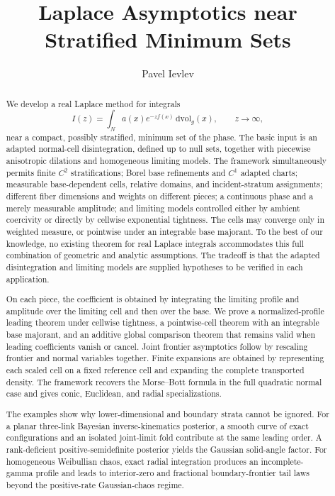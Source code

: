 \documentclass[11pt]{amsart}
\title[Laplace Asymptotics near Stratified Minimum Sets]{Laplace Asymptotics near Stratified Minimum Sets}
\author{Pavel Ievlev}
\date{}
\numberwithin{equation}{section}
\theoremstyle{definition}
\theoremstyle{remark}
\newcommand{\dvol}{\,\mathrm{dvol}}
\begin{document}
\begin{abstract}
We develop a real Laplace method for integrals
\begin{equation*}
  I(z)=\int_N a(x)e^{-z f(x)}\dvol_g(x),\qquad z\to\infty,
\end{equation*}
near a compact, possibly stratified, minimum set of the phase.  The basic input
is an adapted normal-cell disintegration, defined up to null sets, together with
piecewise anisotropic dilations and homogeneous limiting models.  The framework
simultaneously permits finite $C^2$ stratifications; Borel base refinements and
$C^1$ adapted charts; measurable base-dependent cells, relative domains, and
incident-stratum assignments; different fiber dimensions and weights on
different pieces; a continuous phase and a merely measurable amplitude; and
limiting models controlled either by ambient coercivity or directly by
cellwise exponential tightness.  The cells may converge only in weighted
measure, or pointwise under an integrable base majorant.  To the best of our
knowledge, no existing theorem for real Laplace integrals accommodates this
full combination of geometric and analytic assumptions.  The tradeoff is that
the adapted disintegration and limiting models are supplied hypotheses to be
verified in each application.

On each piece, the coefficient is obtained by integrating the limiting profile
and amplitude over the limiting cell and then over the base.  We prove a
normalized-profile leading theorem under cellwise tightness, a pointwise-cell
theorem with an integrable base majorant, and an additive global comparison
theorem that remains valid when leading coefficients vanish or cancel.  Joint
frontier asymptotics follow by rescaling frontier and normal variables together.
Finite expansions are obtained by representing each scaled cell on a fixed
reference cell and expanding the complete transported density.  The framework
recovers the Morse--Bott formula in the full quadratic normal case and gives
conic, Euclidean, and radial specializations.

The examples show why lower-dimensional and boundary strata cannot be ignored.
For a planar three-link Bayesian inverse-kinematics posterior, a smooth curve of
exact configurations and an isolated joint-limit fold contribute at the same
leading order.  A rank-deficient positive-semidefinite posterior yields the
Gaussian solid-angle factor.  For homogeneous Weibullian chaos, exact radial
integration produces an incomplete-gamma profile and leads to interior-zero and
fractional boundary-frontier tail laws beyond the positive-rate Gaussian-chaos
regime.
\end{abstract} 
\maketitle
\end{document}
